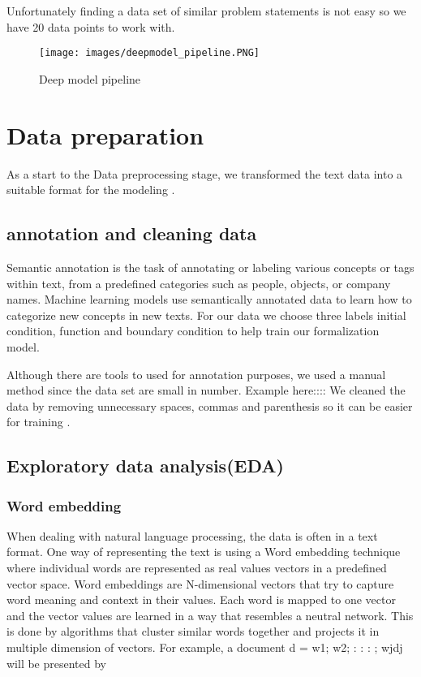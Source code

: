 Unfortunately finding a data set of similar problem statements is not easy so we have 20 data points to work with. 
\begin{figure}
    \centering
    \texttt{[image: images/deepmodel\_pipeline.PNG]}
    \caption{Deep model pipeline}
    \label{fig:4 complete model procesies}
\end{figure}


\section{Data preparation} 
 As a start to the Data  preprocessing stage, we transformed the text data into a suitable format for the modeling . 
\subsection{annotation and cleaning data} 
Semantic annotation is the task of annotating or labeling various concepts or tags within text, from a predefined categories such as people, objects, or company names. Machine learning models use semantically annotated data to learn how to categorize new concepts in new texts. 
For our data we choose three labels initial condition, function and boundary condition to help train our formalization model. 

Although there are tools to used for annotation purposes, we used a manual method since the data set are small in number. 
Example here:::: 
We cleaned the data by removing unnecessary spaces, commas and parenthesis so it can be easier for training .                                                 

\subsection{Exploratory data analysis(EDA)}
\subsubsection{Word embedding} 
When dealing with natural language processing, the data is often in a text format. One way of representing the text is using a Word embedding technique where individual words are represented as real values vectors in a predefined vector space. Word embeddings are N-dimensional vectors that try to capture word meaning and context in their values. Each word is mapped to one vector and the vector values are learned in a way that resembles a neutral network. This is done by algorithms that cluster similar words together and projects it in multiple dimension of vectors. 
For example, a document d = w1; w2; : : : ; wjdj will be
presented by

